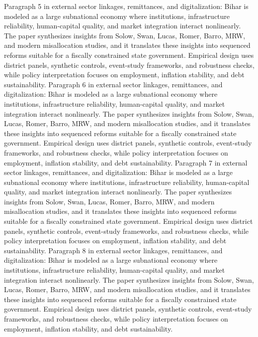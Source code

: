 \documentclass[preprint,12pt]{elsarticle}
\begin{document}
Paragraph 5 in external sector linkages, remittances, and digitalization: Bihar is modeled as a large subnational economy where institutions, infrastructure reliability, human-capital quality, and market integration interact nonlinearly. The paper synthesizes insights from Solow, Swan, Lucas, Romer, Barro, MRW, and modern misallocation studies, and it translates these insights into sequenced reforms suitable for a fiscally constrained state government. Empirical design uses district panels, synthetic controls, event-study frameworks, and robustness checks, while policy interpretation focuses on employment, inflation stability, and debt sustainability.
Paragraph 6 in external sector linkages, remittances, and digitalization: Bihar is modeled as a large subnational economy where institutions, infrastructure reliability, human-capital quality, and market integration interact nonlinearly. The paper synthesizes insights from Solow, Swan, Lucas, Romer, Barro, MRW, and modern misallocation studies, and it translates these insights into sequenced reforms suitable for a fiscally constrained state government. Empirical design uses district panels, synthetic controls, event-study frameworks, and robustness checks, while policy interpretation focuses on employment, inflation stability, and debt sustainability.
Paragraph 7 in external sector linkages, remittances, and digitalization: Bihar is modeled as a large subnational economy where institutions, infrastructure reliability, human-capital quality, and market integration interact nonlinearly. The paper synthesizes insights from Solow, Swan, Lucas, Romer, Barro, MRW, and modern misallocation studies, and it translates these insights into sequenced reforms suitable for a fiscally constrained state government. Empirical design uses district panels, synthetic controls, event-study frameworks, and robustness checks, while policy interpretation focuses on employment, inflation stability, and debt sustainability.
Paragraph 8 in external sector linkages, remittances, and digitalization: Bihar is modeled as a large subnational economy where institutions, infrastructure reliability, human-capital quality, and market integration interact nonlinearly. The paper synthesizes insights from Solow, Swan, Lucas, Romer, Barro, MRW, and modern misallocation studies, and it translates these insights into sequenced reforms suitable for a fiscally constrained state government. Empirical design uses district panels, synthetic controls, event-study frameworks, and robustness checks, while policy interpretation focuses on employment, inflation stability, and debt sustainability.
\end{document}
